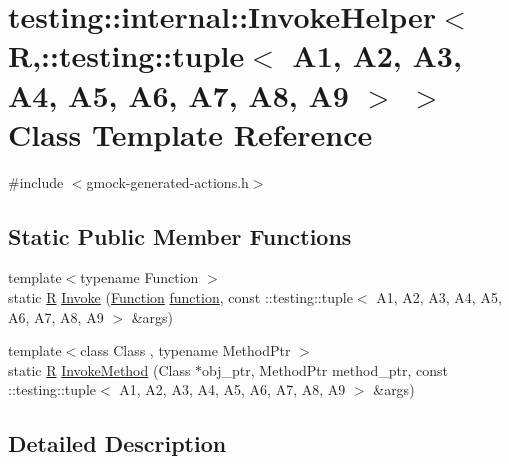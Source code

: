 \hypertarget{classtesting_1_1internal_1_1_invoke_helper_3_01_r_00_1_1testing_1_1tuple_3_01_a1_00_01_a2_00_01_54a05d3b1a768be53cb8b099dc24ceaa}{}\section{testing\+:\+:internal\+:\+:Invoke\+Helper$<$ R,\+:\+:testing\+:\+:tuple$<$ A1, A2, A3, A4, A5, A6, A7, A8, A9 $>$ $>$ Class Template Reference}
\label{classtesting_1_1internal_1_1_invoke_helper_3_01_r_00_1_1testing_1_1tuple_3_01_a1_00_01_a2_00_01_54a05d3b1a768be53cb8b099dc24ceaa}


{\ttfamily \#include $<$gmock-\/generated-\/actions.\+h$>$}

\subsection*{Static Public Member Functions}
\begin{DoxyCompactItemize}
\item 
{\footnotesize template$<$typename Function $>$ }\\static \hyperlink{typedefs__9_8js_afb423b73ee7b6c04d2d54fc06e405404}{R} \hyperlink{classtesting_1_1internal_1_1_invoke_helper_3_01_r_00_1_1testing_1_1tuple_3_01_a1_00_01_a2_00_01_54a05d3b1a768be53cb8b099dc24ceaa_aac1ed3fbb361e6f7b81ef3574029ee29}{Invoke} (\hyperlink{structtesting_1_1internal_1_1_function}{Function} \hyperlink{_07copy_08_2_undistort_image_8m_aa0b19300b507d475ab9f1525750bc11f}{function}, const \+::testing\+::tuple$<$ A1, A2, A3, A4, A5, A6, A7, A8, A9 $>$ \&args)
\item 
{\footnotesize template$<$class Class , typename Method\+Ptr $>$ }\\static \hyperlink{typedefs__9_8js_afb423b73ee7b6c04d2d54fc06e405404}{R} \hyperlink{classtesting_1_1internal_1_1_invoke_helper_3_01_r_00_1_1testing_1_1tuple_3_01_a1_00_01_a2_00_01_54a05d3b1a768be53cb8b099dc24ceaa_a3bf33211c6041b93a0bcc21458a1dee4}{Invoke\+Method} (Class $\ast$obj\+\_\+ptr, Method\+Ptr method\+\_\+ptr, const \+::testing\+::tuple$<$ A1, A2, A3, A4, A5, A6, A7, A8, A9 $>$ \&args)
\end{DoxyCompactItemize}


\subsection{Detailed Description}

